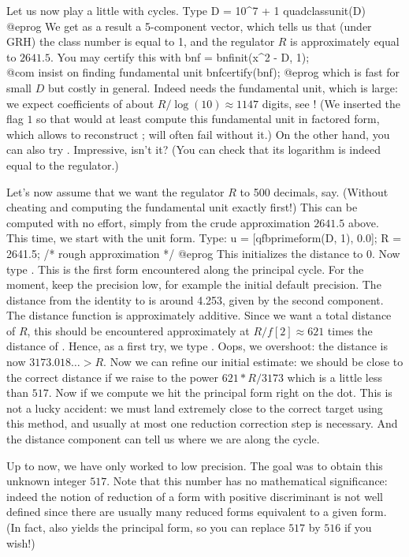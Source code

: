 \medskip Let us now play a little with cycles. Type
\bprog
  D = 10^7 + 1
  quadclassunit(D)
@eprog\noindent
We get as a result a 5-component vector, which tells us that (under GRH) the
class number is equal to 1, and the regulator $R$ is approximately
equal to $2641.5$. You may certify this with
\bprog
  bnf = bnfinit(x^2 - D, 1);  \\ @com insist on finding fundamental unit
  bnfcertify(bnf);
@eprog\noindent
which is fast for small $D$ but costly in general. Indeed 
needs the fundamental unit, which is large: we expect coefficients of about
$R/\log(10)\approx 1147$ digits, see ! (We inserted the flag $1$
so that  would at least compute this fundamental unit in
factored form, which allows to reconstruct ; 
will often fail without it.) On the other hand, you can also try
. Impressive, isn't it? (You can check that its logarithm
is indeed equal to the regulator.)

Let's now assume that we want the regulator $R$ to 500 decimals, say.
(Without cheating and computing the fundamental unit exactly first!)
This can be computed with no effort, simply from the crude approximation
$2641.5$ above. This time, we start with the unit form. Type:
\bprog
  u = [qfbprimeform(D, 1), 0.0];
  R = 2641.5; /* rough approximation */
@eprog\noindent
This initializes the distance to $0$.
Now type  . This is the
first form encountered along the principal cycle. For the moment, keep the
precision low, for example the initial default precision. The distance from
the identity to  is around 4.253, given by the second component.
The distance function is approximately additive.
Since we want a total distance of $R$, this should be encountered
approximately at $R/f[2] \approx 621$ times the distance of . Hence,
as a first try, we type . Oops, we overshoot: the distance is
now $3173.018\dots > R$. Now we can refine our initial estimate: we should be
close to the correct distance if we raise  to the power $621*R/3173$
which is a little less than $517$. Now if we compute  we
hit the principal form right on the dot. This is not a lucky
accident: we must land extremely close to the correct target using this
method, and usually at most one reduction correction step is necessary.
And the distance component can tell us where we are along the cycle.

Up to now, we have only worked to low precision. The goal was to obtain this
unknown integer $517$. Note that this number has no mathematical
significance: indeed the notion of reduction of a form with positive
discriminant is not well defined since there are usually many reduced forms
equivalent to a given form. (In fact,  also yields the
principal form, so you can replace $517$ by $516$ if you wish!)

